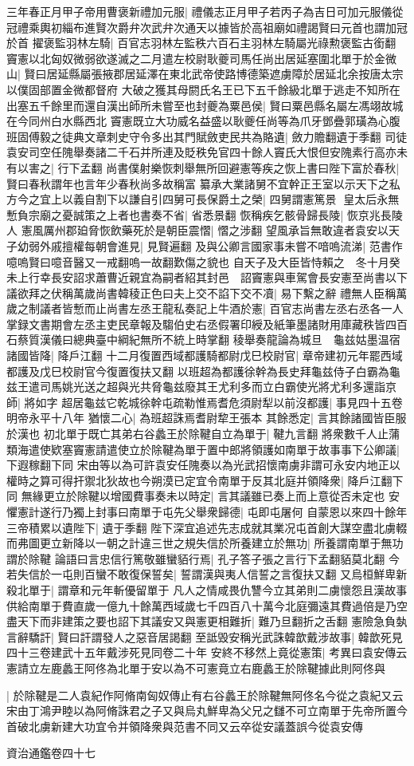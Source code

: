 三年春正月甲子帝用曹褒新禮加元服|{
	禮儀志正月甲子若丙子為吉日可加元服儀從冠禮乘輿初緇布進賢次爵弁次武弁次通天以據皆於高祖廟如禮謁賢曰元首也謂加冠於首}
擢褒監羽林左騎|{
	百官志羽林左監秩六百石主羽林左騎屬光祿勲褒監古銜翻}
竇憲以北匈奴微弱欲遂滅之二月遣左校尉耿夔司馬任尚出居延塞圍北單于於金微山|{
	賢曰居延縣屬張掖郡居延澤在東北武帝使路博德築遮虜障於居延北余按唐太宗以僕固部置金微都督府}
大破之獲其母閼氏名王已下五千餘級北單于逃走不知所在出塞五千餘里而還自漢出師所未嘗至也封夔為粟邑侯|{
	賢曰粟邑縣名屬左馮翊故城在今同州白水縣西北}
竇憲既立大功威名益盛以耿夔任尚等為爪牙鄧疊郭璜為心腹班固傅毅之徒典文章刺史守令多出其門賦斂吏民共為賂遺|{
	斂力贍翻遺于季翻}
司徒袁安司空任隗舉奏諸二千石并所連及貶秩免官四十餘人竇氏大恨但安隗素行高亦未有以害之|{
	行下孟翻}
尚書僕射樂恢刺舉無所回避憲等疾之恢上書曰陛下富於春秋|{
	賢曰春秋謂年也言年少春秋尚多故稱富}
纂承大業諸舅不宜幹正王室以示天下之私方今之宜上以義自割下以謙自引四舅可長保爵土之榮|{
	四舅謂憲篤景}
皇太后永無慙負宗廟之憂誠策之上者也書奏不省|{
	省悉景翻}
恢稱疾乞骸骨歸長陵|{
	恢京兆長陵人}
憲風厲州郡廹脅恢飲藥死於是朝臣震慴|{
	慴之涉翻}
望風承旨無敢違者袁安以天子幼弱外戚擅權每朝會進見|{
	見賢遍翻}
及與公卿言國家事未嘗不喑嗚流涕|{
	范書作噫嗚賢曰噫音醫又一戒翻嗚一故翻歎傷之貌也}
自天子及大臣皆恃賴之　冬十月癸未上行幸長安詔求蕭曹近親宜為嗣者紹其封邑　詔竇憲與車駕會長安憲至尚書以下議欲拜之伏稱萬歲尚書韓稜正色曰夫上交不諂下交不凟|{
	易下繫之辭}
禮無人臣稱萬歲之制議者皆慙而止尚書左丞王龍私奏記上牛酒於憲|{
	百官志尚書左丞右丞各一人掌録文書期會左丞主吏民章報及騶伯史右丞假署印綬及紙筆墨諸財用庫藏秩皆四百石蔡質漢儀曰總典臺中綱紀無所不統上時掌翻}
稜舉奏龍論為城旦　龜兹姑墨温宿諸國皆降|{
	降戶江翻}
十二月復置西域都護騎都尉戊巳校尉官|{
	章帝建初元年罷西域都護及戊巳校尉官今復置復扶又翻}
以班超為都護徐幹為長史拜龜兹侍子白霸為龜兹王遣司馬姚光送之超與光共脅龜兹廢其王尤利多而立白霸使光將尤利多還詣京師|{
	將如字}
超居龜兹它乾城徐幹屯疏勒惟焉耆危須尉犁以前沒都護|{
	事見四十五卷明帝永平十八年}
猶懷二心|{
	為班超誅焉耆尉犂王張本}
其餘悉定|{
	言其餘諸國皆臣服於漢也}
初北單于既亡其弟右谷蠡王於除鞬自立為單于|{
	鞬九言翻}
將衆數千人止蒲類海遣使欵塞竇憲請遣使立於除鞬為單于置中郎將領護如南單于故事事下公卿議|{
	下遐稼翻下同}
宋由等以為可許袁安任隗奏以為光武招懷南虜非謂可永安内地正以權時之算可得扞禦北狄故也今朔漠已定宜令南單于反其北庭并領降衆|{
	降戶江翻下同}
無緣更立於除鞬以增國費事奏未以時定|{
	言其議雖已奏上而上意從否未定也}
安懼憲計遂行乃獨上封事曰南單于屯先父舉衆歸德|{
	屯即屯屠何}
自蒙恩以來四十餘年三帝積累以遺陛下|{
	遺于季翻}
陛下深宜追述先志成就其業况屯首創大謀空盡北虜輟而弗圖更立新降以一朝之計違三世之規失信於所養建立於無功|{
	所養謂南單于無功謂於除鞬}
論語曰言忠信行篤敬雖蠻貊行焉|{
	孔子答子張之言行下孟翻貊莫北翻}
今若失信於一屯則百蠻不敢復保誓矣|{
	誓謂漢與夷人信誓之言復扶又翻}
又烏桓鮮卑新殺北單于|{
	謂章和元年斬優留單于}
凡人之情咸畏仇讐今立其弟則二虜懷怨且漢故事供給南單于費直歲一億九十餘萬西域歲七千四百八十萬今北庭彌遠其費過倍是乃空盡天下而非建策之要也詔下其議安又與憲更相難折|{
	難乃旦翻折之舌翻}
憲險急負埶言辭驕訐|{
	賢曰訐謂發人之惡音居謁翻}
至詆毁安稱光武誅韓歆戴涉故事|{
	韓歆死見四十三卷建武十五年戴涉死見同卷二十年}
安終不移然上竟從憲策|{
	考異曰袁安傳云憲請立左鹿蠡王阿佟為北單于安以為不可憲竟立右鹿蠡王於除鞬據此則阿佟與}


|{
	於除鞬是二人袁紀作阿脩南匈奴傳止有右谷蠡王於除鞬無阿佟名今從之袁紀又云宋由丁鴻尹睦以為阿脩誅君之子又與烏丸鮮卑為父兄之讎不可立南單于先帝所置今首破北虜新建大功宜令并領降衆與范書不同又云卒從安議蓋誤今從袁安傳}


資治通鑑卷四十七
